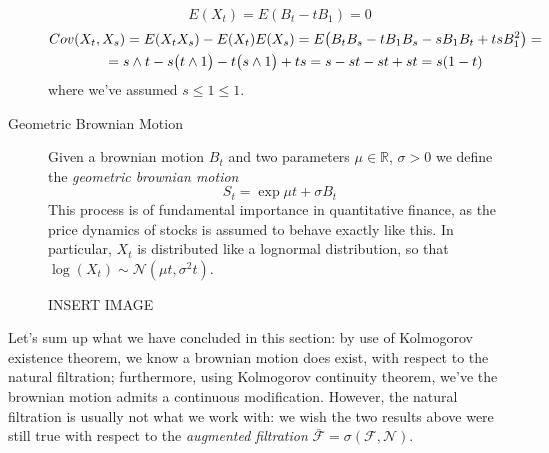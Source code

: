 \begin{description}
    \begin{equation}
        E(X_t) = E(B_t - t B_1) = 0
    \end{equation}
    \begin{gather}
        Cov(X_t, X_s) = E(X_t X_s) - E(X_t) E(X_s) = E\big(B_t B_s - t B_1 B_s - s B_1 B_t + ts B_1^2\big) = \notag \\
        = s \wedge t - s \big(t \wedge 1\big) - t \big( s \wedge 1 \big) + ts = s -st -st + st = s(1-t)
    \end{gather}
    where we've assumed $s \leq 1 \leq 1$. 
    \item[Geometric Brownian Motion] Given a brownian motion $B_t$ and two parameters $\mu \in \mathbb{R}$, $\sigma > 0$ we define the \textit{geometric brownian motion}
    \begin{equation}
        S_t = \exp{\mu t + \sigma B_t}
    \end{equation}
    This process is of fundamental importance in quantitative finance, as the price dynamics of stocks is assumed to behave exactly like this. In particular, $X_t$ is distributed like a lognormal distribution, so that $\log(X_t) \sim \mathcal{N}(\mu t, \sigma^2 t)$. 

    INSERT IMAGE
\end{description}

Let's sum up what we have concluded in this section: by use of Kolmogorov existence theorem, we know a brownian motion does exist, with respect to the natural filtration; furthermore, using Kolmogorov continuity theorem, we've the brownian motion admits a continuous modification. However, the natural filtration is usually not what we work with: we wish the two results above were still true with respect to the \textit{augmented filtration} $\bar{\mathcal{F}} = \sigma(\mathcal{F},\mathcal{N})$. 

